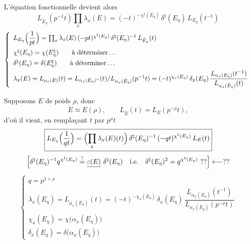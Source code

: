 \documentclass[11pt,a4paper]{article}
\begin{document}
L'équation fonctionnelle devient alors
\[
  L_{\check E_\eta}(p^{-1} t) \prod_x \lambda_x(E)
  = (-t)^{-\chi^{\natural}(E_\eta)}\, \delta^{\natural}(E_\eta)\, L_{E_\eta}(t^{-1})
\]
\[
  \left\lbrace
  \begin{array}{l}
    L_{E_\eta}\Bigl(\dfrac{1}{pt}\Bigr) = \prod_x \lambda_x(E)\,
      (-pt)^{\chi^{\natural}(E_\eta)}\, \delta^{\natural}(E_\eta)^{-1}\, L_{\check E_\eta}(t) \\[10pt]
    \chi^{\natural}(E_\eta) = \chi(E_\eta^{\natural}) \qquad \text{à déterminer} \ldots \\[4pt]
    \delta^{\natural}(E_\eta) = \delta(E_\eta^{\natural}) \qquad \text{à déterminer} \ldots \\[4pt]
    \lambda_x(E) = L_{\mu_x(E)}(t) = L_{\alpha_x(E_\eta)^{\vee}}(t) / L_{\alpha_x(\check E_\eta)}(p^{-1} t)
      = (-t)^{\chi_x(E_\eta)}\, \delta_x(E_\eta)\,
      \dfrac{L_{\alpha_x(E_\eta)}(t^{-1})}{L_{\alpha_x(\check E_\eta)}(t)}
  \end{array}
  \right.
\]

Supposons $E$ de poids $\rho$, donc
\[
  \check E \simeq E(\rho) , \qquad L_{\check E}(t) = L_E(p^{-\rho} t) ,
\]
d'où il vient, en remplaçant $t$ par $p^{\rho} t$
\[
  \boxed{L_{E_\eta}\Bigl(\frac{1}{qt}\Bigr) = \Bigl(\prod_x \lambda_x(E)(t)\Bigr)\,
    \delta^{\natural}(E_\eta)^{-1}\, (-qt)^{\chi^{\natural}(E_\eta)}\, L_E(t)}
\]
\[
  \Bigl[\delta^{\natural}(E_\eta)^{-1} q^{\chi^{\natural}(E_\eta)}
    \overset{?}{=} \struck{\varepsilon(E)}\ \delta^{\natural}(E_\eta)
    \quad \text{i.e.} \quad
    \delta^{\natural}(E_\eta)^2 = q^{\chi^{\natural}(E_\eta)} \ ??\Bigr]
    \longleftarrow ??
\]
\[
  \left\lbrace
  \begin{array}{l}
    q = p^{1+\rho} \\[4pt]
    \lambda_x(E_\eta) = L_{\mu_x(E_\eta)}(t)
      = (-t)^{-\chi_x(E_\eta)}\, \delta_x(E_\eta)\,
      \dfrac{L_{\alpha_x(E_\eta)}(t^{-1})}{L_{\alpha_x(E_\eta)}(p^{-\rho} t)} \\[10pt]
    \chi_x(E_\eta) = \chi\bigl(\alpha_x(E_\eta)\bigr) \\[4pt]
    \delta_x(E_\eta) = \delta\bigl(\alpha_x(E_\eta)\bigr)
  \end{array}
  \right.
\]
\end{document}
